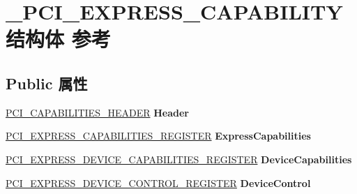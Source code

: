 \hypertarget{struct___p_c_i___e_x_p_r_e_s_s___c_a_p_a_b_i_l_i_t_y}{}\section{\+\_\+\+P\+C\+I\+\_\+\+E\+X\+P\+R\+E\+S\+S\+\_\+\+C\+A\+P\+A\+B\+I\+L\+I\+T\+Y结构体 参考}
\label{struct___p_c_i___e_x_p_r_e_s_s___c_a_p_a_b_i_l_i_t_y}
\subsection*{Public 属性}
\begin{DoxyCompactItemize}
\item 
\mbox{\label{struct___p_c_i___e_x_p_r_e_s_s___c_a_p_a_b_i_l_i_t_y_a4ffddcec3875e9602bf502b0d22512b4}} 
\hyperlink{struct___p_c_i___c_a_p_a_b_i_l_i_t_i_e_s___h_e_a_d_e_r}{P\+C\+I\+\_\+\+C\+A\+P\+A\+B\+I\+L\+I\+T\+I\+E\+S\+\_\+\+H\+E\+A\+D\+ER} {\bfseries Header}
\item 
\mbox{\label{struct___p_c_i___e_x_p_r_e_s_s___c_a_p_a_b_i_l_i_t_y_ad55a2ad3d2ab793a8d8be02dd56e0fbc}} 
\hyperlink{union___p_c_i___e_x_p_r_e_s_s___c_a_p_a_b_i_l_i_t_i_e_s___r_e_g_i_s_t_e_r}{P\+C\+I\+\_\+\+E\+X\+P\+R\+E\+S\+S\+\_\+\+C\+A\+P\+A\+B\+I\+L\+I\+T\+I\+E\+S\+\_\+\+R\+E\+G\+I\+S\+T\+ER} {\bfseries Express\+Capabilities}
\item 
\mbox{\label{struct___p_c_i___e_x_p_r_e_s_s___c_a_p_a_b_i_l_i_t_y_a685abdfa112b058d21155a6890a3697d}} 
\hyperlink{union___p_c_i___e_x_p_r_e_s_s___d_e_v_i_c_e___c_a_p_a_b_i_l_i_t_i_e_s___r_e_g_i_s_t_e_r}{P\+C\+I\+\_\+\+E\+X\+P\+R\+E\+S\+S\+\_\+\+D\+E\+V\+I\+C\+E\+\_\+\+C\+A\+P\+A\+B\+I\+L\+I\+T\+I\+E\+S\+\_\+\+R\+E\+G\+I\+S\+T\+ER} {\bfseries Device\+Capabilities}
\item 
\mbox{\label{struct___p_c_i___e_x_p_r_e_s_s___c_a_p_a_b_i_l_i_t_y_afde65a6e6c89852e9cee003ba0d96c29}} 
\hyperlink{union___p_c_i___e_x_p_r_e_s_s___d_e_v_i_c_e___c_o_n_t_r_o_l___r_e_g_i_s_t_e_r}{P\+C\+I\+\_\+\+E\+X\+P\+R\+E\+S\+S\+\_\+\+D\+E\+V\+I\+C\+E\+\_\+\+C\+O\+N\+T\+R\+O\+L\+\_\+\+R\+E\+G\+I\+S\+T\+ER} {\bfseries Device\+Control}

\end{DoxyCompactItemize}
